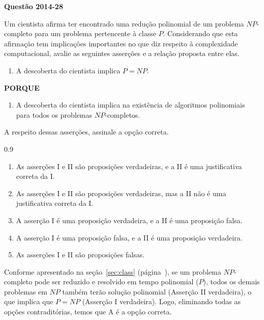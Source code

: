 \documentclass[12pt,a4paper]{article}
\newenvironment{question}[1]{%
    \pdfbookmark[3]{Questão #1}{q:#1}
    \label{q:#1}
    \bigskip\par\noindent
    \textbf{Questão #1} \dotfill
    \medskip\par\nopagebreak\noindent
    \ignorespaces
}{%
    \noindent\dotfill\medskip
}
\begin{document}
\begin{question}{2014-28}
Um cientista afirma ter encontrado uma redução polinomial de um problema $NP$-completo para um problema pertencente à classe $P$.
Considerando que esta afirmação tem implicações importantes no que diz respeito à complexidade computacional,
avalie as seguintes asserções e a relação proposta entre elas.

\begin{enumerate}[label=\Roman*.]
    \item A descoberta do cientista implica $P = NP$.
\end{enumerate}

\begin{center}
    \textbf{PORQUE}
\end{center}

\begin{enumerate}[label=\Roman*., start=2]
    \item A descoberta do cientista implica na existência de algoritmos polinomiais para todos os problemas $NP$-completos.
\end{enumerate}

\noindent
A respeito dessas asserções, assinale a opção correta.

\begin{spacing}{0.9}
\begin{small}
\begin{enumerate}[label=\Alph*)]
    \item As asserções I e II são proposições verdadeiras, e a II é uma justificativa correta da I.
    \item As asserções I e II são proposições verdadeiras, mas a II não é uma justificativa correta da I.
    \item A asserção I é uma proposição verdadeira, e a II é uma proposição falsa.
    \item A asserção I é uma proposição falsa, e a II é uma proposição verdadeira.
    \item As asserções I e II são proposições falsas.
\end{enumerate}
\end{small}
\end{spacing}
\end{question}

Conforme apresentado na seção~\ref{sec:class} (página~\pageref{it:npc}),
se um problema $NP$-completo pode ser reduzido e resolvido em tempo polinomial ($P$),
todos os demais problemas em $NP$ também terão solução polinomial (Asserção II verdadeira),
o que implica que $P = NP$ (Asserção I verdadeira).
Logo, eliminando todas as opções contraditórias, temos que A é a opção correta.
\end{document}

